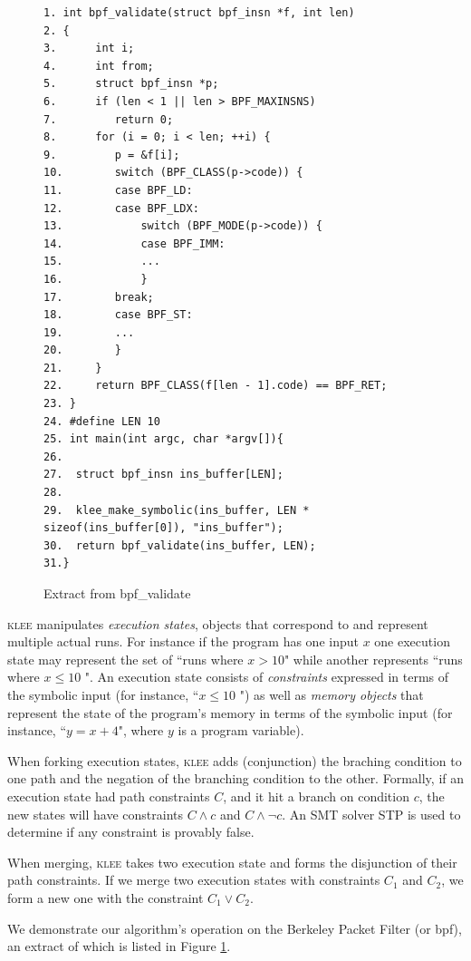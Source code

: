 \documentclass[12pt,a4paper]{article}
\newcommand{\klee}{\textsc{klee }}
\begin{document}
\linespread{0}
\begin{figure}
\small
\begin{verbatim}
1. int bpf_validate(struct bpf_insn *f, int len)
2. {
3.      int i;
4.      int from;
5.      struct bpf_insn *p;
6.      if (len < 1 || len > BPF_MAXINSNS)
7.         return 0;
8.      for (i = 0; i < len; ++i) {
9.         p = &f[i];
10.        switch (BPF_CLASS(p->code)) {
11.        case BPF_LD:
12.        case BPF_LDX:
13.            switch (BPF_MODE(p->code)) {
14.            case BPF_IMM:
15.            ...
16.            }
17.        break;
18.        case BPF_ST:
19.        ...
20.        }
21.     }
22.     return BPF_CLASS(f[len - 1].code) == BPF_RET;
23. }
24. #define LEN 10 
25. int main(int argc, char *argv[]){  
26.
27.  struct bpf_insn ins_buffer[LEN];
28.
29.  klee_make_symbolic(ins_buffer, LEN * sizeof(ins_buffer[0]), "ins_buffer");
30.  return bpf_validate(ins_buffer, LEN);
31.}
\end{verbatim}
\caption{Extract from bpf\_validate}
\label{bpfcode}
\end{figure}

\klee manipulates \emph{execution states}, objects that correspond to and represent multiple actual runs. For instance if the program has one input $x$ one execution state may represent the set of ``runs where $x > 10$" while another represents ``runs where $x \le 10$ ". An execution state consists of \emph{constraints} expressed in terms of the symbolic input (for instance, ``$x \le 10$ ") as well as \emph{memory objects} that represent the state of the program's memory in terms of the symbolic input (for instance, ``$y = x + 4$", where $y$ is a program variable).

When forking execution states, \klee adds (conjunction) the braching condition to one path and the negation of the branching condition to the other. Formally, if an execution state had path constraints $C$, and it hit a branch on condition $c$, the new states will have constraints $C \wedge c$ and $C \wedge \neg c$. An SMT solver STP \cite{bitvecarray} is used to determine if any constraint is provably false.

When merging, \klee takes two execution state and forms the disjunction of their path constraints. If we merge two execution states with constraints $C_1$ and $C_2$, we form a new one with the constraint $C_1 \vee C_2$.

We demonstrate our algorithm's operation on the Berkeley Packet Filter (or bpf), an extract of which is listed in Figure \ref{bpfcode}.
\end{document}

